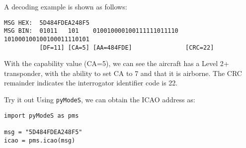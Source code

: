 A decoding example is shown as follows:

\begin{verbatim}
MSG HEX:  5D484FDEA248F5
MSG BIN:  01011   101    010010000100111111011110  101000100100100011110101
          [DF=11] [CA=5] [AA=484FDE]               [CRC=22]
\end{verbatim}

With the capability value (CA=5), we can see the aircraft has a Level 2+ transponder, with the ability to set CA to 7 and that it is airborne. The CRC remainder indicates the interrogator identifier code is 22.

\begin{notebox}{Try it out}
Using \texttt{pyModeS}, we can obtain the ICAO address as: 

\begin{verbatim}
import pyModeS as pms

msg = "5D484FDEA248F5"
icao = pms.icao(msg)
\end{verbatim}

\end{notebox}